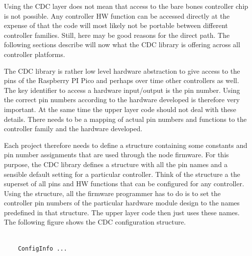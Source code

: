 Using the CDC layer does not mean that access to the bare bones controller chip is not possible. Any controller HW function can be accessed directly at the expense of that the code will most likely not be portable between different controller families. Still, here may be good reasons for the direct path. The following sections describe will now what the CDC library is offering across all controller platforms.


The CDC library is rather low level hardware abstraction to give access to the pins of the Raspberry PI Pico and perhaps over time other controllers as well. The key identifier to access a hardware input/output is the pin number. Using the correct pin numbers according to the hardware developed is therefore very important. At the same time the upper layer code should not deal with these details. There needs to be a mapping of actual pin numbers and functions to the controller family and the hardware developed.

Each project therefore needs to define a structure containing some constants and pin number assignments that are used through the node firmware. For this purpose, the CDC library defines a structure with all the pin names and a sensible default setting for a particular controller. Think of the structure a the superset of all pins and HW functions that can be configured for any controller. Using the structure, all the firmware programmer has to do is to set the controller pin numbers of the particular hardware module design to the names predefined in that structure. The upper layer code then just uses these names. The following figure shows the CDC configuration structure.

\lstset{language=c++, style=codesnippetstyle}
\begin{lstlisting}
   
    ConfigInfo ...
    
\end{lstlisting}
\FloatBarrier

